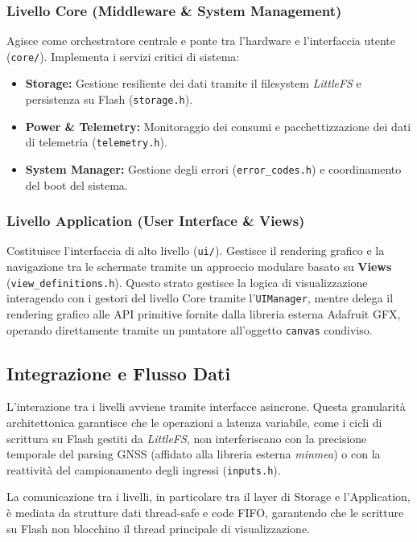 \subsubsection*{Livello Core (Middleware \& System Management)}
Agisce come orchestratore centrale e ponte tra l'hardware e l'interfaccia utente (\texttt{core/}). Implementa i servizi critici di sistema:
\begin{itemize}
    \item \textbf{Storage:} Gestione resiliente dei dati tramite il filesystem \textit{LittleFS} e persistenza su Flash (\texttt{storage.h}).
    \item \textbf{Power \& Telemetry:} Monitoraggio dei consumi e pacchettizzazione dei dati di telemetria (\texttt{telemetry.h}).
    \item \textbf{System Manager:} Gestione degli errori (\texttt{error\_codes.h}) e coordinamento del boot del sistema.
\end{itemize}

\subsubsection*{Livello Application (User Interface \& Views)}
Costituisce l'interfaccia di alto livello (\texttt{ui/}). Gestisce il rendering grafico e la navigazione tra le schermate tramite un approccio modulare basato su \textbf{Views} (\texttt{view\_definitions.h}). Questo strato gestisce la logica di visualizzazione interagendo con i gestori del livello Core tramite l'\texttt{UIManager}, mentre delega il rendering grafico alle API primitive fornite dalla libreria esterna Adafruit GFX, operando direttamente tramite un puntatore all'oggetto \texttt{canvas} condiviso.
\subsection{Integrazione e Flusso Dati}

L'interazione tra i livelli avviene tramite interfacce asincrone. Questa granularità architettonica garantisce che le operazioni a latenza variabile, come i cicli di scrittura su Flash gestiti da \textit{LittleFS}, non interferiscano con la precisione temporale del parsing GNSS (affidato alla libreria esterna \textit{minmea}) o con la reattività del campionamento degli ingressi (\texttt{inputs.h}).

La comunicazione tra i livelli, in particolare tra il layer di Storage e l'Application, è mediata da strutture dati thread-safe e code FIFO, garantendo che le scritture su Flash non blocchino il thread principale di visualizzazione.
